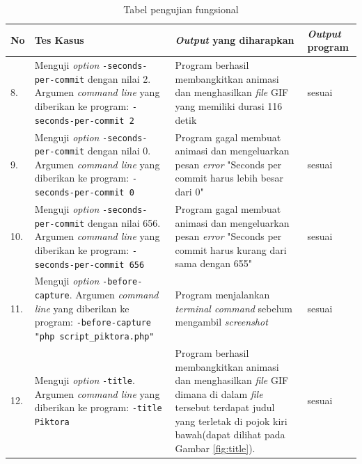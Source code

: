 \begin{table}[htbp]
\begin{tabular}{|p{0.3cm}|>{\raggedright} p{5.5 cm}| p{7 cm}| p{3 cm}|}
		
		
		
		\end{tabular}
	\label{table:hasil_pengujian1}
\end{table}


\begin{table}[htbp]
	\centering
	\caption{Tabel pengujian fungsional}
	
		\begin{tabular}{|p{0.3cm}|>{\raggedright} p{7 cm}| p{5.5 cm}| p{3 cm}|} \hline
		No & Tes Kasus	& \textit{Output} yang diharapkan & \textit{Output} program \\ \hline
		8. & Menguji \textit{option} \texttt{-seconds-per-commit} dengan nilai 2. Argumen \textit{command line} yang diberikan ke program: \texttt{-seconds-per-commit 2} & Program berhasil membangkitkan animasi dan menghasilkan \textit{file} GIF yang memiliki durasi 116 detik & sesuai \\ \hline
		9. & Menguji \textit{option} \texttt{-seconds-per-commit} dengan nilai 0. Argumen \textit{command line} yang diberikan ke program: \texttt{-seconds-per-commit 0} & Program gagal membuat animasi dan mengeluarkan pesan \textit{error} "Seconds per commit harus lebih besar dari 0" & sesuai \\ \hline
		10. & Menguji \textit{option} \texttt{-seconds-per-commit} dengan nilai 656. Argumen \textit{command line} yang diberikan ke program: \texttt{-seconds-per-commit 656} & Program gagal membuat animasi dan mengeluarkan pesan \textit{error} "Seconds per commit harus kurang dari sama dengan 655" & sesuai \\ \hline
		11. & Menguji \textit{option} \texttt{-before-capture}. Argumen \textit{command line} yang diberikan ke program: \texttt{-before-capture "php script\_piktora.php"} & Program menjalankan \textit{terminal command} sebelum mengambil \textit{screenshot} & sesuai  \\ \hline
		
		12. & Menguji \textit{option} \texttt{-title}. Argumen \textit{command line} yang diberikan ke program: \texttt{-title Piktora}  & Program berhasil membangkitkan animasi dan menghasilkan \textit{file} GIF dimana di dalam \textit{file} tersebut terdapat judul yang terletak di pojok kiri bawah(dapat dilihat pada Gambar \ref{fig:title}). & sesuai \\ \hline
					

\end{tabular}
\end{table}
